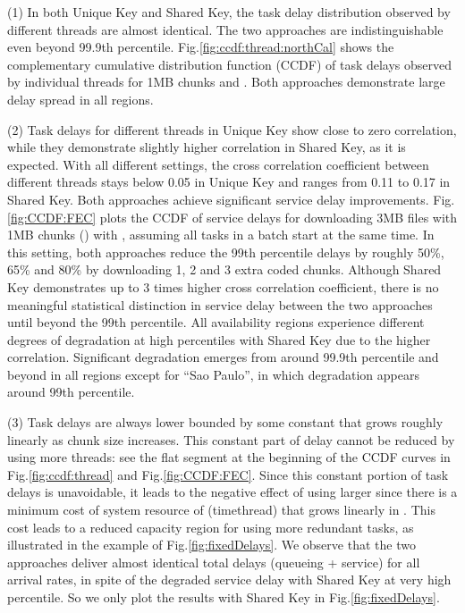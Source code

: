 \documentclass[journal]{IEEEtran}
\begin{document}
(1)
\label{obs:identicalDistribution} 
In both Unique Key and Shared Key, the task delay distribution observed by different threads are almost identical. The two approaches are indistinguishable  even beyond 99.9th percentile. Fig.\ref{fig:ccdf:thread:northCal} shows the complementary cumulative distribution function (CCDF) of task delays observed by individual threads for 1MB chunks and . Both approaches demonstrate large delay spread in all regions. 



(2)
\label{obs:weakCorrelation}
Task delays for different threads in Unique Key show close to zero correlation, while they demonstrate slightly higher correlation in Shared Key, as it is  expected.
With all different settings, the cross correlation coefficient between different threads stays below 0.05 in Unique Key and ranges from 0.11 to 0.17 in Shared Key. 
Both approaches achieve significant service delay improvements. 
Fig.\ref{fig:CCDF:FEC} plots the CCDF of service delays for downloading 3MB files with 1MB chunks () with , assuming all  tasks in a batch start at the same time. In this setting, both approaches reduce the 99th percentile delays by roughly 50\%, 65\% and 80\% by downloading 1, 2 and 3 extra coded chunks. Although Shared Key demonstrates up to 3 times higher cross correlation coefficient, there is no meaningful statistical distinction in service delay between the two approaches until beyond the 99th percentile.
All availability regions experience different degrees of degradation at high percentiles with Shared Key due to the higher correlation. 
Significant degradation emerges from around 99.9th percentile and beyond in all regions except for ``Sao Paulo'', in which degradation appears around 99th percentile.



(3)
\label{obs:lowerBound} 
Task delays are always lower bounded by some constant  that grows roughly linearly as chunk size increases. This constant part of delay cannot be reduced by using more threads: see the flat segment at the beginning of the CCDF curves in Fig.\ref{fig:ccdf:thread} and Fig.\ref{fig:CCDF:FEC}. Since this constant portion of task delays is unavoidable, it leads to the negative effect of using larger  since there is a minimum cost of system resource of  (timethread) that grows linearly in . This cost leads to a reduced capacity region for using more redundant tasks, as illustrated in the example of Fig.\ref{fig:fixedDelays}. 
We observe that the two approaches deliver almost identical total delays (queueing + service) for all arrival rates, in spite of the degraded service delay with Shared Key at very high percentile. So we only plot the results with Shared Key in Fig.\ref{fig:fixedDelays}.
\end{document}
